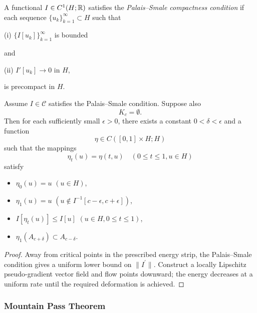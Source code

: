 \begin{definition}
\label{def:palais-smale-condition}
A functional $I \in C^1(H;\mathbb{R})$ satisfies the \textit{Palais--Smale compactness condition} if each sequence $\{u_k\}_{k=1}^\infty \subset H$ such that

(i) $\{I[u_k]\}_{k=1}^\infty$ is bounded

and

(ii) $I'[u_k] \to 0$ in $H$,

is precompact in $H$.
\end{definition}

\begin{theorem}
\label{thm:deformation-theorem}

Assume $I \in \mathcal{C}$ satisfies the Palais--Smale condition. Suppose also
\[
K_c = \emptyset.
\tag{3}
\]
Then for each sufficiently small $\epsilon > 0$, there exists a constant $0 < \delta < \epsilon$ and a function
\[
\eta \in C([0,1] \times H; H)
\]
such that the mappings
\[
\eta_t(u) = \eta(t, u) \quad (0 \le t \le 1, u \in H)
\]
satisfy
\begin{itemize}
\item[(i)] $\eta_0(u) = u$ \quad $(u \in H)$,
\item[(ii)] $\eta_1(u) = u$ \quad $(u \notin I^{-1}[c - \epsilon, c + \epsilon])$,
\item[(iii)] $I[\eta_t(u)] \le I[u]$ \quad $(u \in H, 0 \le t \le 1)$,
\item[(iv)] $\eta_1(A_{c+\delta}) \subset A_{c-\delta}$.
\end{itemize}
\end{theorem}

\begin{proof}
\sketch Away from critical points in the prescribed energy strip, the Palais--Smale condition gives a uniform lower bound on $\|I^{\prime}\|$. Construct a locally Lipschitz pseudo-gradient vector field and flow points downward; the energy decreases at a uniform rate until the required deformation is achieved.
\end{proof}

\subsubsection{Mountain Pass Theorem}

